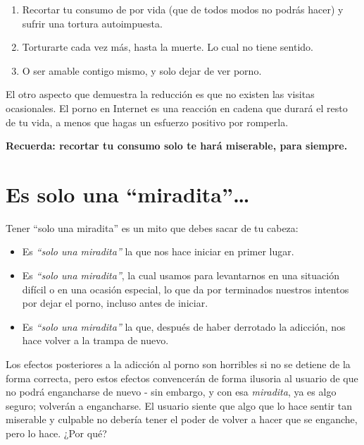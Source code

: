 \documentclass[
  spanish,
  openany]{book}
\providecommand{\tightlist}{%
  \setlength{\itemsep}{0pt}\setlength{\parskip}{0pt}}
\begin{document}
\begin{enumerate}
\def\labelenumi{\arabic{enumi}.}
\tightlist
\item
  Recortar tu consumo de por vida (que de todos modos no podrás hacer) y sufrir una tortura autoimpuesta.
\item
  Torturarte cada vez más, hasta la muerte. Lo cual no tiene sentido.
\item
  O ser amable contigo mismo, y solo dejar de ver porno.
\end{enumerate}

El otro aspecto que demuestra la reducción es que no existen las visitas ocasionales. El porno en Internet es una reacción en cadena que durará el resto de tu vida, a menos que hagas un esfuerzo positivo por romperla.

\textbf{Recuerda: recortar tu consumo solo te hará miserable, para siempre.}

\hypertarget{es-solo-una-miradita}{%
\chapter{Es solo una ``miradita''\ldots{}}\label{es-solo-una-miradita}}

Tener ``solo una miradita'' es un mito que debes sacar de tu cabeza:

\begin{itemize}
\tightlist
\item
  Es \emph{``solo una miradita''} la que nos hace iniciar en primer lugar.
\item
  Es \emph{``solo una miradita''}, la cual usamos para levantarnos en una situación difícil o en una ocasión especial, lo que da por terminados nuestros intentos por dejar el porno, incluso antes de iniciar.
\item
  Es \emph{``solo una miradita''} la que, después de haber derrotado la adicción, nos hace volver a la trampa de nuevo.
\end{itemize}

Los efectos posteriores a la adicción al porno son horribles si no se detiene de la forma correcta, pero estos efectos convencerán de forma ilusoria al usuario de que no podrá engancharse de nuevo - sin embargo, y con esa \emph{miradita}, ya es algo seguro; volverán a engancharse. El usuario siente que algo que lo hace sentir tan miserable y culpable no debería tener el poder de volver a hacer que se enganche, pero lo hace. ¿Por qué?
\end{document}
